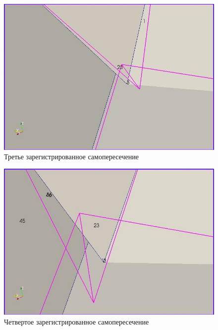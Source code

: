 \documentclass[a4paper,12pt, titlepage]{article}
\begin{document}
\begin{flushleft}
  \begin{figure}[p]
    \includegraphics[clip, width=13cm]{img/consections-3.jpeg}
    \caption{Третье зарегистрированное самопересечение}\label{consections-3}
  \end{figure}
\end{flushleft}
\begin{flushleft}
  \begin{figure}[p]
    \includegraphics[clip, width=13cm]{img/consections-4.jpeg}
    \caption{Четвертое зарегистрированное самопересечение}\label{consections-4}
  \end{figure}
\end{flushleft}
\end{document}
